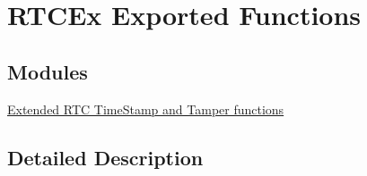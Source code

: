 \hypertarget{group___r_t_c_ex___exported___functions}{}\section{R\+T\+C\+Ex Exported Functions}
\label{group___r_t_c_ex___exported___functions}
\subsection*{Modules}
\begin{DoxyCompactItemize}
\item 
\hyperlink{group___r_t_c_ex___exported___functions___group1}{Extended R\+T\+C Time\+Stamp and Tamper functions}
\end{DoxyCompactItemize}


\subsection{Detailed Description}
